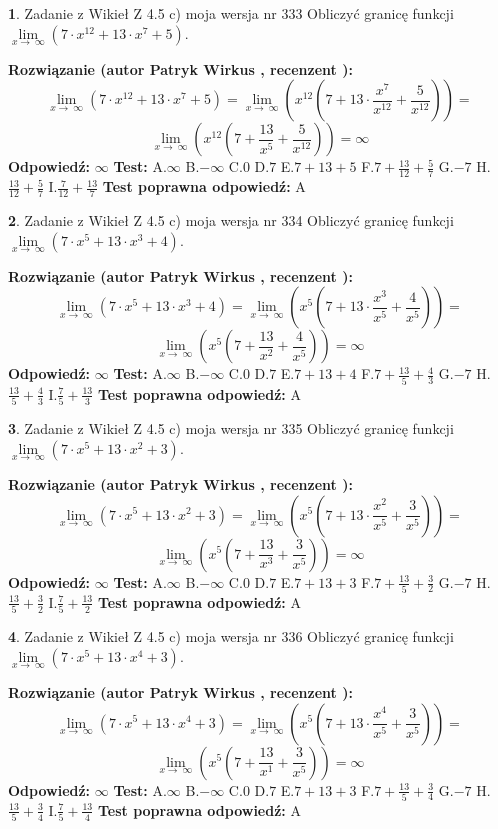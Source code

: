 \documentclass[12pt, a4paper]{article}
\theoremstyle{definition} %
\newtheorem{zad}{}
\newcommand{\zadStart}[1]{\begin{zad}#1\newline}
\newcommand{\zadStop}{\end{zad}}
\newcommand{\rozwStart}[2]{\noindent \textbf{Rozwiązanie (autor #1 , recenzent #2): }\newline}
\newcommand{\rozwStop}{\newline}
\newcommand{\odpStart}{\noindent \textbf{Odpowiedź:}\newline}
\newcommand{\odpStop}{\newline}
\newcommand{\testStart}{\noindent \textbf{Test:}\newline}
\newcommand{\testStop}{\newline}
\newcommand{\kluczStart}{\noindent \textbf{Test poprawna odpowiedź:}\newline}
\newcommand{\kluczStop}{\newline}
\begin{document}
\zadStart{Zadanie z Wikieł Z 4.5 c) moja wersja nr 333}
Obliczyć granicę funkcji  $\lim\limits_{x\to\ \infty}(7 \cdot x^{12}+13 \cdot x^{7}+5)$.
\zadStop
\rozwStart{Patryk Wirkus}{}
$$\lim\limits_{x\to\ \infty}(7 \cdot x^{12}+13 \cdot x^{7}+5) = \lim\limits_{x\to\ \infty}(x^{12}(7 +13 \cdot \frac{x^{7}}{x^{12}}+\frac{5}{x^{12}})) =$$ $$\lim\limits_{x\to\ \infty}(x^{12}(7 +\frac{13}{x^{5}}+\frac{5}{x^{12}})) =\infty$$
\rozwStop
\odpStart
$\infty$
\odpStop
\testStart
A.$\infty$ B.$-\infty$ C.$0$ D.$7$ E.$7 + 13 + 5$
F.$7+\frac{13}{12}+\frac{5}{7}$ G.$-7$
H.$\frac{13}{12}+\frac{5}{7}$
I.$\frac{7}{12}+\frac{13}{7}$
\testStop
\kluczStart
A
\kluczStop



\zadStart{Zadanie z Wikieł Z 4.5 c) moja wersja nr 334}
Obliczyć granicę funkcji  $\lim\limits_{x\to\ \infty}(7 \cdot x^{5}+13 \cdot x^{3}+4)$.
\zadStop
\rozwStart{Patryk Wirkus}{}
$$\lim\limits_{x\to\ \infty}(7 \cdot x^{5}+13 \cdot x^{3}+4) = \lim\limits_{x\to\ \infty}(x^{5}(7 +13 \cdot \frac{x^{3}}{x^{5}}+\frac{4}{x^{5}})) =$$ $$\lim\limits_{x\to\ \infty}(x^{5}(7 +\frac{13}{x^{2}}+\frac{4}{x^{5}})) =\infty$$
\rozwStop
\odpStart
$\infty$
\odpStop
\testStart
A.$\infty$ B.$-\infty$ C.$0$ D.$7$ E.$7 + 13 + 4$
F.$7+\frac{13}{5}+\frac{4}{3}$ G.$-7$
H.$\frac{13}{5}+\frac{4}{3}$
I.$\frac{7}{5}+\frac{13}{3}$
\testStop
\kluczStart
A
\kluczStop



\zadStart{Zadanie z Wikieł Z 4.5 c) moja wersja nr 335}
Obliczyć granicę funkcji  $\lim\limits_{x\to\ \infty}(7 \cdot x^{5}+13 \cdot x^{2}+3)$.
\zadStop
\rozwStart{Patryk Wirkus}{}
$$\lim\limits_{x\to\ \infty}(7 \cdot x^{5}+13 \cdot x^{2}+3) = \lim\limits_{x\to\ \infty}(x^{5}(7 +13 \cdot \frac{x^{2}}{x^{5}}+\frac{3}{x^{5}})) =$$ $$\lim\limits_{x\to\ \infty}(x^{5}(7 +\frac{13}{x^{3}}+\frac{3}{x^{5}})) =\infty$$
\rozwStop
\odpStart
$\infty$
\odpStop
\testStart
A.$\infty$ B.$-\infty$ C.$0$ D.$7$ E.$7 + 13 + 3$
F.$7+\frac{13}{5}+\frac{3}{2}$ G.$-7$
H.$\frac{13}{5}+\frac{3}{2}$
I.$\frac{7}{5}+\frac{13}{2}$
\testStop
\kluczStart
A
\kluczStop



\zadStart{Zadanie z Wikieł Z 4.5 c) moja wersja nr 336}
Obliczyć granicę funkcji  $\lim\limits_{x\to\ \infty}(7 \cdot x^{5}+13 \cdot x^{4}+3)$.
\zadStop
\rozwStart{Patryk Wirkus}{}
$$\lim\limits_{x\to\ \infty}(7 \cdot x^{5}+13 \cdot x^{4}+3) = \lim\limits_{x\to\ \infty}(x^{5}(7 +13 \cdot \frac{x^{4}}{x^{5}}+\frac{3}{x^{5}})) =$$ $$\lim\limits_{x\to\ \infty}(x^{5}(7 +\frac{13}{x^{1}}+\frac{3}{x^{5}})) =\infty$$
\rozwStop
\odpStart
$\infty$
\odpStop
\testStart
A.$\infty$ B.$-\infty$ C.$0$ D.$7$ E.$7 + 13 + 3$
F.$7+\frac{13}{5}+\frac{3}{4}$ G.$-7$
H.$\frac{13}{5}+\frac{3}{4}$
I.$\frac{7}{5}+\frac{13}{4}$
\testStop
\kluczStart
A
\kluczStop
\end{document}

